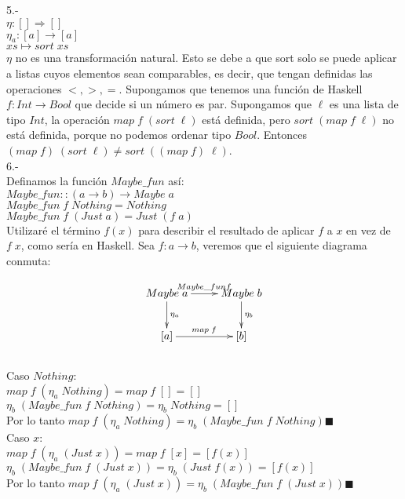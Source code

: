 \documentclass{article}
\begin{document}
5.-\\ $\eta : [] \Rightarrow []$ \\ $\eta_{a} : [a] \rightarrow [a]$ \\ $xs \mapsto sort \; xs$\\

$\eta$ no es una transformación natural. Esto se debe a que sort solo se puede aplicar a listas cuyos elementos sean comparables, es decir, que tengan definidas las operaciones $<,>,=$. Supongamos que tenemos una función de Haskell $f:Int \rightarrow Bool$ que decide si un número es par. Supongamos que $\ell$ es una lista de tipo $Int$, la operación $map \; f \; (sort \; \ell)$ está definida, pero $sort \; (map \; f \; \ell)$ no está definida, porque no podemos ordenar tipo $Bool$. Entonces $(map \; f) \; (sort \; \ell) \neq sort \; ((map \; f) \; \ell)$. \\

6.-\\
Definamos la función $Maybe\_fun$ así:\\
$Maybe\_fun :: (a \rightarrow b) \rightarrow Maybe \; a$\\
$Maybe\_fun \; f \; Nothing = Nothing$\\
$Maybe\_fun \; f \; (Just \; a) = Just \; (f \; a)$\\

Utilizaré el término $f(x)$ para describir el resultado de aplicar $f$ a $x$ en vez de $f \; x$, como sería en Haskell. Sea $f:a \rightarrow b$, veremos que el siguiente diagrama conmuta:

\[
\xymatrix{
Maybe \; a \ar[d]^{\eta_{a}} \ar[r]^{Maybe\_fun f} & Maybe \; b \ar[d]^{\eta_{b}} \\
[a] \ar[r]^{map \; f} & [b]
}
\]
\\

Caso $Nothing$:\\
$map\;f\;(\eta_{a}\;Nothing)=map\;f\;[]=[]$ \\
$\eta_{b}\;(Maybe\_fun\;f\;Nothing)= \eta_{b}\;Nothing=[]$ \\
Por lo tanto $map\;f\;(\eta_{a}\;Nothing)=\eta_{b}\;(Maybe\_fun\;f\;Nothing) \blacksquare$\\

Caso $x$:\\
$map\;f\;(\eta_{a}\;(Just\;x))=map\;f\;[x]=[f(x)]$\\
$\eta_{b}\;(Maybe\_fun\;f\;(Just\;x))=\eta_{b}\;(Just\;f(x))=[f(x)]$\\
Por lo tanto $map\;f\;(\eta_{a}\;(Just\;x))=\eta_{b}\;(Maybe\_fun\;f\;(Just\;x)) \blacksquare$
\end{document}
